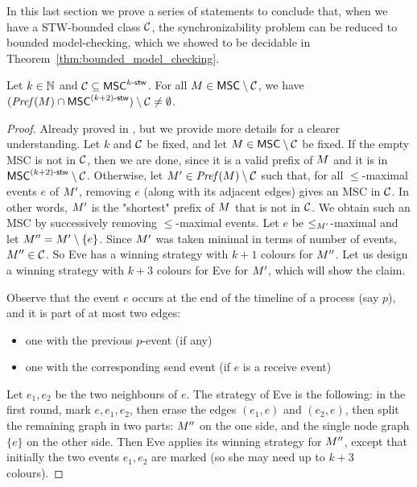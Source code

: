 In this last section we prove a series of statements to conclude that, when we have a STW-bounded class $\mathcal{C}$, the synchronizability problem can be reduced to bounded model-checking, which we showed to be decidable in Theorem~\ref{thm:bounded_model_checking}.

\begin{proposition}\label{prop:pref_stw_k+2}
	Let $k \in \mathbb{N}$ and $\mathcal{C} \subseteq \mathsf{MSC}^{k\textup{-}\mathsf{stw}}$. For all
	$M \in \mathsf{MSC} \setminus \mathcal{C}$, we have
	$(\mathit{Pref}(M) \cap \mathsf{MSC}^{(k+2)\textup{-}\mathsf{stw}}) \setminus \mathcal{C} \neq \emptyset$.
\end{proposition}
\begin{proof}
    Already proved in \cite{BolligFG21}, but we provide more details for a clearer understanding.
    Let $k$ and $\mathcal{C}$ be fixed, and let
    $M\in \mathsf{MSC}\setminus \mathcal{C}$ be fixed. If the empty MSC is not in $\mathcal{C}$, then we are done, since it is a valid prefix of $M$ and it is in $\mathsf{MSC}^{(k+2)\textup{-}\mathsf{stw}} \setminus \mathcal{C}$.
    Otherwise, let $M'\in \mathit{Pref}(M) \setminus \mathcal{C}$ such that, for all $\le$-maximal events $e$ of $M'$, removing $e$ (along with its adjacent edges) gives an MSC in $\mathcal{C}$. In other words, $M'$ is the "shortest" prefix of $M$ that is not in $\mathcal{C}$. We obtain such an MSC by successively removing $\le$-maximal events. Let $e$ be $\le_{M'}$-maximal and let $M''=M' \setminus \{e\}$. Since $M'$ was taken minimal in terms of number of events,	$M''\in \mathcal{C}$.
    So Eve has a winning strategy with $k+1$ colours for $M''$.
    Let us design a winning strategy with $k+3$ colours for Eve for $M'$, which will show the claim.

    Observe that the event $e$ occurs at the end of the timeline of a process (say $p$), and it is part of at most two edges:
    \begin{itemize}
        \item one with the previous $p$-event (if any)
        \item one with the corresponding send event (if $e$ is a receive event)
    \end{itemize}
    Let $e_1,e_2$ be the two neighbours of $e$.
    The strategy of Eve is the following: in the first round, mark $e,e_1,e_2$,
    then erase the edges $(e_1,e)$ and $(e_2,e)$, then split the remaining graph
    in two parts: $M''$ on the one side, and the single node graph $\{e\}$ on
    the other side. Then Eve applies its winning strategy for $M''$, except
    that initially the two events $e_1,e_2$ are marked (so she may need up to $k+3$
    colours).
\end{proof}

